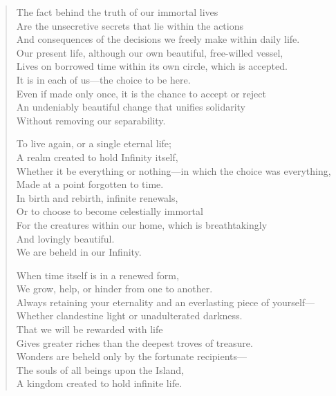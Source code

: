 \documentclass[12pt]{amsart}
\begin{document}
\begin{verse}
The fact behind the truth of our immortal lives\\
Are the unsecretive secrets that lie within the actions\\
And consequences of the decisions we freely make within daily life.\\
Our present life, although our own beautiful, free-willed vessel,\\
Lives on borrowed time within its own circle, which is accepted.\\
It is in each of us---the choice to be here.\\
Even if made only once, it is the chance to accept or reject\\
An undeniably beautiful change that unifies solidarity\\
Without removing our separability.

To live again, or a single eternal life;\\
A realm created to hold Infinity itself,\\
Whether it be everything or nothing---in which the choice was everything,\\
Made at a point forgotten to time.\\
In birth and rebirth, infinite renewals,\\
Or to choose to become celestially immortal\\
For the creatures within our home, which is breathtakingly\\
And lovingly beautiful.\\
We are beheld in our Infinity.

When time itself is in a renewed form,\\
We grow, help, or hinder from one to another.\\
Always retaining your eternality and an everlasting piece of yourself---\\
Whether clandestine light or unadulterated darkness.\\
That we will be rewarded with life\\
Gives greater riches than the deepest troves of treasure.\\
Wonders are beheld only by the fortunate recipients---\\
The souls of all beings upon the Island,\\
A kingdom created to hold infinite life.


\end{verse}
\end{document}
